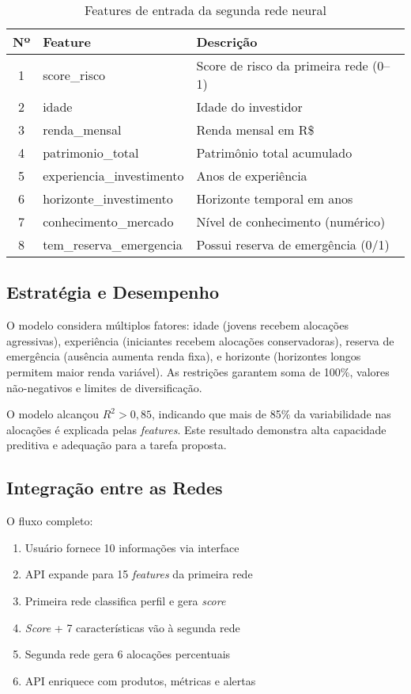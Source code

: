 \begin{table}[htbp]
\centering
\caption{Features de entrada da segunda rede neural}
\label{tab:features_segunda_rede}
\begin{tabular}{@{}clp{7cm}@{}}
\toprule
\textbf{Nº} & \textbf{Feature} & \textbf{Descrição} \\ \midrule
1 & score\_risco & Score de risco da primeira rede (0--1) \\
2 & idade & Idade do investidor \\
3 & renda\_mensal & Renda mensal em R\$ \\
4 & patrimonio\_total & Patrimônio total acumulado \\
5 & experiencia\_investimento & Anos de experiência \\
6 & horizonte\_investimento & Horizonte temporal em anos \\
7 & conhecimento\_mercado & Nível de conhecimento (numérico) \\
8 & tem\_reserva\_emergencia & Possui reserva de emergência (0/1) \\ \bottomrule
\end{tabular}
\end{table}

\subsection{Estratégia e Desempenho}

O modelo considera múltiplos fatores: idade (jovens recebem alocações agressivas), experiência (iniciantes recebem alocações conservadoras), reserva de emergência (ausência aumenta renda fixa), e horizonte (horizontes longos permitem maior renda variável). As restrições garantem soma de 100\%, valores não-negativos e limites de diversificação.

O modelo alcançou $R^2 > 0,85$, indicando que mais de 85\% da variabilidade nas alocações é explicada pelas \textit{features}. Este resultado demonstra alta capacidade preditiva e adequação para a tarefa proposta.

\subsection{Integração entre as Redes}

O fluxo completo:
\begin{enumerate}
    \item Usuário fornece 10 informações via interface
    \item API expande para 15 \textit{features} da primeira rede
    \item Primeira rede classifica perfil e gera \textit{score}
    \item \textit{Score} + 7 características vão à segunda rede
    \item Segunda rede gera 6 alocações percentuais
    \item API enriquece com produtos, métricas e alertas
\end{enumerate}

